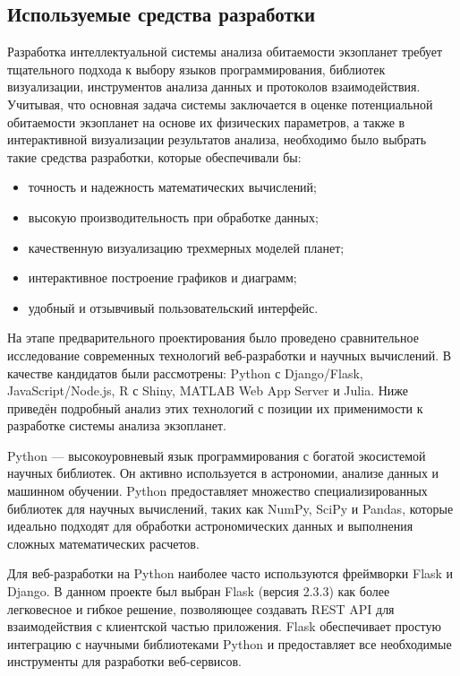 \subsection{Используемые средства разработки}

Разработка интеллектуальной системы анализа обитаемости экзопланет требует тщательного подхода к выбору языков программирования, библиотек визуализации, инструментов анализа данных и протоколов взаимодействия. Учитывая, что основная задача системы заключается в оценке потенциальной обитаемости экзопланет на основе их физических параметров, а также в интерактивной визуализации результатов анализа, необходимо было выбрать такие средства разработки, которые обеспечивали бы:
\begin{itemize}
    \item точность и надежность математических вычислений;
    \item высокую производительность при обработке данных;
    \item качественную визуализацию трехмерных моделей планет;
    \item интерактивное построение графиков и диаграмм;
    \item удобный и отзывчивый пользовательский интерфейс.
\end{itemize}

На этапе предварительного проектирования было проведено сравнительное исследование современных технологий веб-разработки и научных вычислений. В качестве кандидатов были рассмотрены: Python с Django/Flask, JavaScript/Node.js, R с Shiny, MATLAB Web App Server и Julia. Ниже приведён подробный анализ этих технологий с позиции их применимости к разработке системы анализа экзопланет.

Python — высокоуровневый язык программирования с богатой экосистемой научных библиотек. Он активно используется в астрономии, анализе данных и машинном обучении. Python предоставляет множество специализированных библиотек для научных вычислений, таких как NumPy, SciPy и Pandas, которые идеально подходят для обработки астрономических данных и выполнения сложных математических расчетов.

Для веб-разработки на Python наиболее часто используются фреймворки Flask и Django. В данном проекте был выбран Flask (версия 2.3.3) как более легковесное и гибкое решение, позволяющее создавать REST API для взаимодействия с клиентской частью приложения. Flask обеспечивает простую интеграцию с научными библиотеками Python и предоставляет все необходимые инструменты для разработки веб-сервисов.

